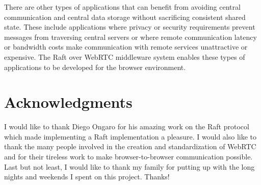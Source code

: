 \documentclass[conference,compsoc]{./IEEEtran/IEEEtran}
\begin{document}
There are other types of applications that can benefit from avoiding central communication and central data storage without sacrificing consistent shared state. These include applications where privacy or security requirements prevent messages from traversing central servers or where remote communication latency or bandwidth costs make communication with remote services unattractive or expensive. The Raft over WebRTC middleware system enables these types of applications to be developed for the browser environment.

\section*{Acknowledgments}

I would like to thank Diego Ongaro for his amazing work on the Raft protocol which made implementing a Raft implementation a pleasure. I would also like to thank the many people involved in the creation and standardization of WebRTC and for their tireless work to make browser-to-browser communication possible. Last but not least, I would like to thank my family for putting up with the long nights and weekends I spent on this project. Thanks!



\end{document}
